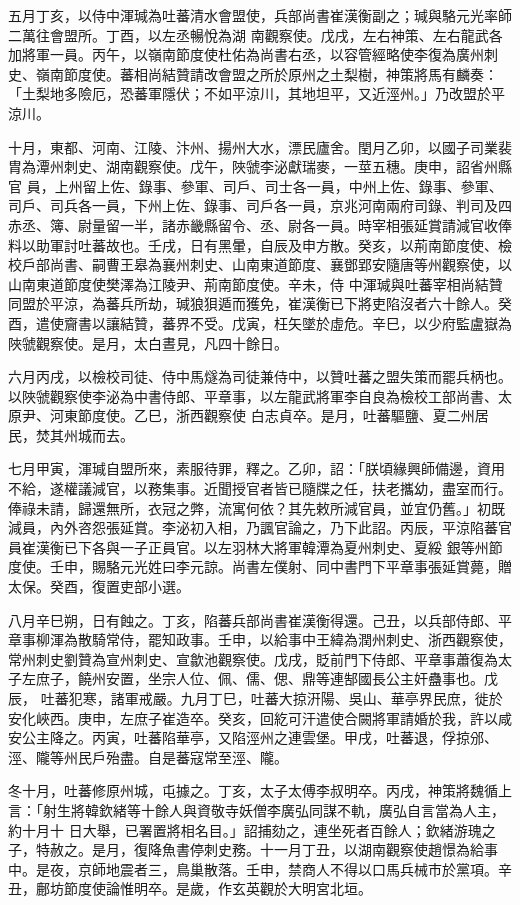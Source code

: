 \begin{pinyinscope}
 五月丁亥，以侍中渾瑊為吐蕃清水會盟使，兵部尚書崔漢衡副之；瑊與駱元光率師二萬往會盟所。丁酉，以左丞暢悅為湖
 南觀察使。戊戌，左右神策、左右龍武各加將軍一員。丙午，以嶺南節度使杜佑為尚書右丞，以容管經略使李復為廣州刺史、嶺南節度使。蕃相尚結贊請改會盟之所於原州之土梨樹，神策將馬有麟奏：「土梨地多險厄，恐蕃軍隱伏；不如平涼川，其地坦平，又近涇州。」乃改盟於平涼川。



 十月，東都、河南、江陵、汴州、揚州大水，漂民廬舍。閏月乙卯，以國子司業裴胄為潭州刺史、湖南觀察使。戊午，陜虢李泌獻瑞麥，一莖五穗。庚申，詔省州縣官
 員，上州留上佐、錄事、參軍、司戶、司士各一員，中州上佐、錄事、參軍、司戶、司兵各一員，下州上佐、錄事、司戶各一員，京兆河南兩府司錄、判司及四赤丞、簿、尉量留一半，諸赤畿縣留令、丞、尉各一員。時宰相張延賞請減官收俸料以助軍討吐蕃故也。壬戌，日有黑暈，自辰及申方散。癸亥，以荊南節度使、檢校戶部尚書、嗣曹王皋為襄州刺史、山南東道節度、襄鄧郢安隨唐等州觀察使，以山南東道節度使樊澤為江陵尹、荊南節度使。辛未，侍
 中渾瑊與吐蕃宰相尚結贊同盟於平涼，為蕃兵所劫，瑊狼狽遁而獲免，崔漢衡已下將吏陷沒者六十餘人。癸酉，遣使齎書以讓結贊，蕃界不受。戊寅，枉矢墜於虛危。辛巳，以少府監盧嶽為陜虢觀察使。是月，太白晝見，凡四十餘日。



 六月丙戌，以檢校司徒、侍中馬燧為司徒兼侍中，以贊吐蕃之盟失策而罷兵柄也。以陜虢觀察使李泌為中書侍郎、平章事，以左龍武將軍李自良為檢校工部尚書、太原尹、河東節度使。乙巳，浙西觀察使
 白志貞卒。是月，吐蕃驅鹽、夏二州居民，焚其州城而去。



 七月甲寅，渾瑊自盟所來，素服待罪，釋之。乙卯，詔：「朕頃緣興師備邊，資用不給，遂權議減官，以務集事。近聞授官者皆已隨牒之任，扶老攜幼，盡室而行。俸祿未請，歸還無所，衣冠之弊，流寓何依？其先敕所減官員，並宜仍舊。」初既減員，內外咨怨張延賞。李泌初入相，乃諷官論之，乃下此詔。丙辰，平涼陷蕃官員崔漢衡已下各與一子正員官。以左羽林大將軍韓潭為夏州刺史、夏綏
 銀等州節度使。壬申，賜駱元光姓曰李元諒。尚書左僕射、同中書門下平章事張延賞薨，贈太保。癸酉，復置吏部小選。



 八月辛巳朔，日有蝕之。丁亥，陷蕃兵部尚書崔漢衡得還。己丑，以兵部侍郎、平章事柳渾為散騎常侍，罷知政事。壬申，以給事中王緯為潤州刺史、浙西觀察使，常州刺史劉贊為宣州刺史、宣歙池觀察使。戊戌，貶前門下侍郎、平章事蕭復為太子左庶子，饒州安置，坐宗人位、佩、儒、偲、鼎等連郜國長公主奸蠱事也。戊辰，
 吐蕃犯寒，諸軍戒嚴。九月丁巳，吐蕃大掠汧陽、吳山、華亭界民庶，徙於安化峽西。庚申，左庶子崔造卒。癸亥，回紇可汗遣使合闕將軍請婚於我，許以咸安公主降之。丙寅，吐蕃陷華亭，又陷涇州之連雲堡。甲戌，吐蕃退，俘掠邠、涇、隴等州民戶殆盡。自是蕃寇常至涇、隴。



 冬十月，吐蕃修原州城，屯據之。丁亥，太子太傅李叔明卒。丙戌，神策將魏循上言：「射生將韓欽緒等十餘人與資敬寺妖僧李廣弘同謀不軌，廣弘自言當為人主，約十月十
 日大舉，已署置將相名目。」詔捕劾之，連坐死者百餘人；欽緒游瑰之子，特赦之。是月，復降魚書停刺史務。十一月丁丑，以湖南觀察使趙憬為給事中。是夜，京師地震者三，鳥巢散落。壬申，禁商人不得以口馬兵械市於黨項。辛丑，鄜坊節度使論惟明卒。是歲，作玄英觀於大明宮北垣。



\end{pinyinscope}